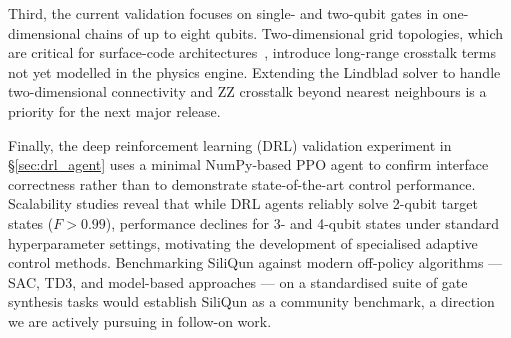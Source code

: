 Third, the current validation focuses on single- and two-qubit gates in one-dimensional chains of up to eight qubits. Two-dimensional grid topologies, which are critical for surface-code architectures~\cite{Fowler2012}, introduce long-range crosstalk terms not yet modelled in the physics engine. Extending the Lindblad solver to handle two-dimensional connectivity and ZZ crosstalk beyond nearest neighbours is a priority for the next major release.

Finally, the deep reinforcement learning (DRL) validation experiment in \S\ref{sec:drl_agent} uses a minimal NumPy-based PPO agent to confirm interface correctness rather than to demonstrate state-of-the-art control performance. Scalability studies reveal that while DRL agents reliably solve 2-qubit target states ($F > 0.99$), performance declines for 3- and 4-qubit states under standard hyperparameter settings, motivating the development of specialised adaptive control methods. Benchmarking SiliQun against modern off-policy algorithms — SAC, TD3, and model-based approaches — on a standardised suite of gate synthesis tasks would establish SiliQun as a community benchmark, a direction we are actively pursuing in follow-on work.

